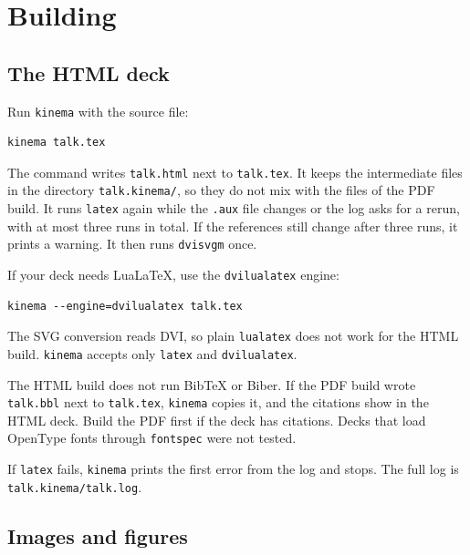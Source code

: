 \documentclass[11pt]{article}
\newcommand{\cmd}[1]{\texttt{#1}}
\begin{document}
\section{Building}

\subsection{The HTML deck}

Run \cmd{kinema} with the source file:
\begin{lstlisting}
kinema talk.tex
\end{lstlisting}
The command writes \cmd{talk.html} next to \cmd{talk.tex}. It keeps the
intermediate files in the directory \cmd{talk.kinema/}, so they do not mix with
the files of the PDF build. It runs \cmd{latex} again while the \cmd{.aux} file
changes or the log asks for a rerun, with at most three runs in total. If the
references still change after three runs, it prints a warning. It then runs
\cmd{dvisvgm} once.

If your deck needs LuaLaTeX, use the \cmd{dvilualatex} engine:
\begin{lstlisting}
kinema --engine=dvilualatex talk.tex
\end{lstlisting}
The SVG conversion reads DVI, so plain \cmd{lualatex} does not work for the HTML
build. \cmd{kinema} accepts only \cmd{latex} and \cmd{dvilualatex}.

The HTML build does not run BibTeX or Biber. If the PDF build wrote
\cmd{talk.bbl} next to \cmd{talk.tex}, \cmd{kinema} copies it, and the
citations show in the HTML deck. Build the PDF first if the deck has citations. Decks that load OpenType fonts through \cmd{fontspec} were not tested.

If \cmd{latex} fails, \cmd{kinema} prints the first error from the log and stops.
The full log is \cmd{talk.kinema/talk.log}.

\subsection{Images and figures}
\end{document}
